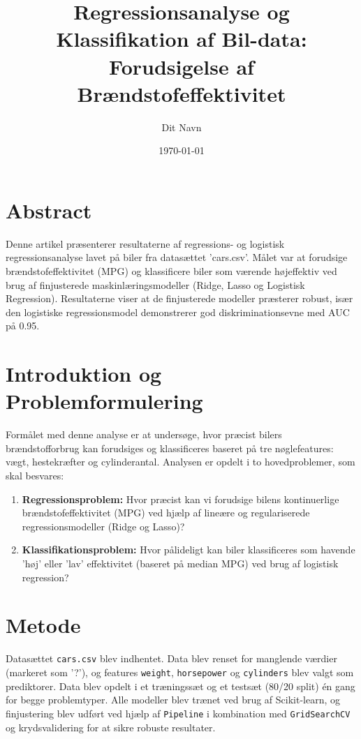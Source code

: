 \documentclass{article}
\title{Regressionsanalyse og Klassifikation af Bil-data: Forudsigelse af Brændstofeffektivitet}
\author{Dit Navn}
\date{\today}
\begin{document}
\maketitle


\section*{Abstract}
Denne artikel præsenterer resultaterne af regressions- og logistisk regressionsanalyse lavet på biler fra datasættet 'cars.csv'. 
Målet var at forudsige brændstofeffektivitet (MPG) og klassificere biler som værende højeffektiv ved brug af finjusterede maskinlæringsmodeller (Ridge, Lasso og Logistisk Regression). 
Resultaterne viser at de finjusterede modeller præsterer robust, især den logistiske regressionsmodel demonstrerer god diskriminationsevne med AUC på 0.95.

\section{Introduktion og Problemformulering}

Formålet med denne analyse er at undersøge, hvor præcist bilers brændstofforbrug kan forudsiges og klassificeres baseret på tre nøglefeatures: vægt, hestekræfter og cylinderantal. 
Analysen er opdelt i to hovedproblemer, som skal besvares:

\begin{enumerate}
    \item \textbf{Regressionsproblem:} Hvor præcist kan vi forudsige bilens kontinuerlige brændstofeffektivitet (MPG) ved hjælp af lineære og regulariserede regressionsmodeller (Ridge og Lasso)?
    \item \textbf{Klassifikationsproblem:} Hvor pålideligt kan biler klassificeres som havende 'høj' eller 'lav' effektivitet (baseret på median MPG) ved brug af logistisk regression?
\end{enumerate}

\section{Metode}

Datasættet \texttt{cars.csv} blev indhentet. Data blev renset for manglende værdier (markeret som '?'), og features \texttt{weight}, \texttt{horsepower} og \texttt{cylinders} blev valgt som prediktorer. Data blev opdelt i et træningssæt og et testsæt (80/20 split) én gang for begge problemtyper. Alle modeller blev trænet ved brug af Scikit-learn, og finjustering blev udført ved hjælp af \texttt{Pipeline} i kombination med \texttt{GridSearchCV} og krydsvalidering for at sikre robuste resultater.
\end{document}

